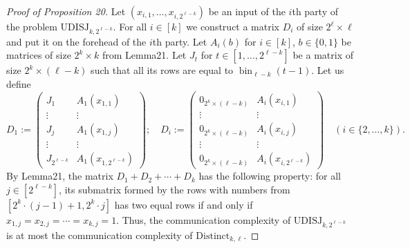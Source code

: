 \begin{proof}[Proof of Proposition 20]
Let $(x_{i,1},\ldots,x_{i,2^{\ell-k}})$ be an input of the $i$th party of the problem $\mathrm{UDISJ}_{k,2^{\ell-k}}$. For all $i\in[k]$ we construct a matrix $D_i$ of size $2^\ell\times\ell$ and put it on the forehead of the $i$th party. Let $A_i(b)$ for $i\in[k]$, $b\in\{0,1\}$ be matrices of size $2^k\times k$ from Lemma21. Let $J_t$ for $t\in[1,\ldots,2^{\ell-k}]$ be a matrix of size $2^k\times(\ell-k)$ such that all its rows are equal to $\operatorname{bin}_{\ell-k}(t-1)$. Let us define
\[
D_1:=\begin{pmatrix}J_1&A_1(x_{1,1})\\\vdots&\vdots\\J_j&A_1(x_{1,j})\\\vdots&\vdots\\J_{2^{\ell-k}}&A_1(x_{1,2^{\ell-k}})\end{pmatrix};
\quad
D_i:=\begin{pmatrix}0_{2^k\times(\ell-k)}&A_i(x_{i,1})\\\vdots&\vdots\\0_{2^k\times(\ell-k)}&A_i(x_{i,j})\\\vdots&\vdots\\0_{2^k\times(\ell-k)}&A_i(x_{i,2^{\ell-k}})\end{pmatrix}
\quad(i\in\{2,\ldots,k\}).
\]
By Lemma21, the matrix $D_1+D_2+\cdots+D_k$ has the following property: for all $j\in[2^{\ell-k}]$, its submatrix formed by the rows with numbers from $[2^k\cdot(j-1)+1,2^k\cdot j]$ has two equal rows if and only if $x_{1,j}=x_{2,j}=\cdots=x_{k,j}=1$. Thus, the communication complexity of $\mathrm{UDISJ}_{k,2^{\ell-k}}$ is at most the communication complexity of $\mathrm{Distinct}_{k,\ell}$.
\end{proof}
